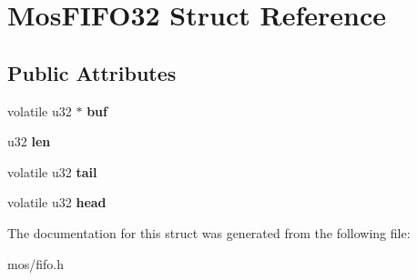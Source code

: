\hypertarget{structMosFIFO32}{}\section{Mos\+F\+I\+F\+O32 Struct Reference}
\label{structMosFIFO32}
\subsection*{Public Attributes}
\begin{DoxyCompactItemize}
\item 
\mbox{\label{structMosFIFO32_a5eb1d98c5f8c776f57ad6778e59f3190}} 
volatile u32 $\ast$ {\bfseries buf}
\item 
\mbox{\label{structMosFIFO32_abce3395b3a68379262ab2d2b9c7663e7}} 
u32 {\bfseries len}
\item 
\mbox{\label{structMosFIFO32_a7c3a0c1ee1957dce9f90805d4e05587d}} 
volatile u32 {\bfseries tail}
\item 
\mbox{\label{structMosFIFO32_a03eefc208e06b1f30aba58e127c2e623}} 
volatile u32 {\bfseries head}
\end{DoxyCompactItemize}


The documentation for this struct was generated from the following file\+:\begin{DoxyCompactItemize}
\item 
mos/fifo.\+h\end{DoxyCompactItemize}
